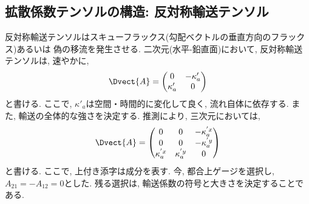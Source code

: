 \subsection{拡散係数テンソルの構造: 反対称輸送テンソル}
反対称輸送テンソルはスキューフラックス(勾配ベクトルの垂直方向のフラックス)あるいは
偽の移流を発生させる. 
二次元(水平-鉛直面)において, 反対称輸送テンソルは, 速やかに, 
\begin{equation}
  \Dvect{A} =
\begin{pmatrix}
  0 &-\kappa'_a \\
  \kappa'_a &0
\end{pmatrix}
\end{equation}
と書ける. 
ここで, $\kappa'_a$は空間・時間的に変化して良く, 流れ自体に依存する. 
また, 輸送の全体的な強さを決定する. 
推測により, 三次元においては, 
\begin{equation}
  \Dvect{A} =
\begin{pmatrix}
  0 &0 &-\kappa_a^{'x} \\
  0 &0 &-\kappa_a^{'y} \\
  \kappa_a^{'x} &\kappa_a^{'y} &0
\end{pmatrix}
\end{equation}
と書ける. 
ここで, 上付き添字は成分を表す. 
今, 都合上ゲージを選択し, $A_{21}=-A_{12}=0$とした. 
残る選択は, 輸送係数の符号と大きさを決定することである. 

